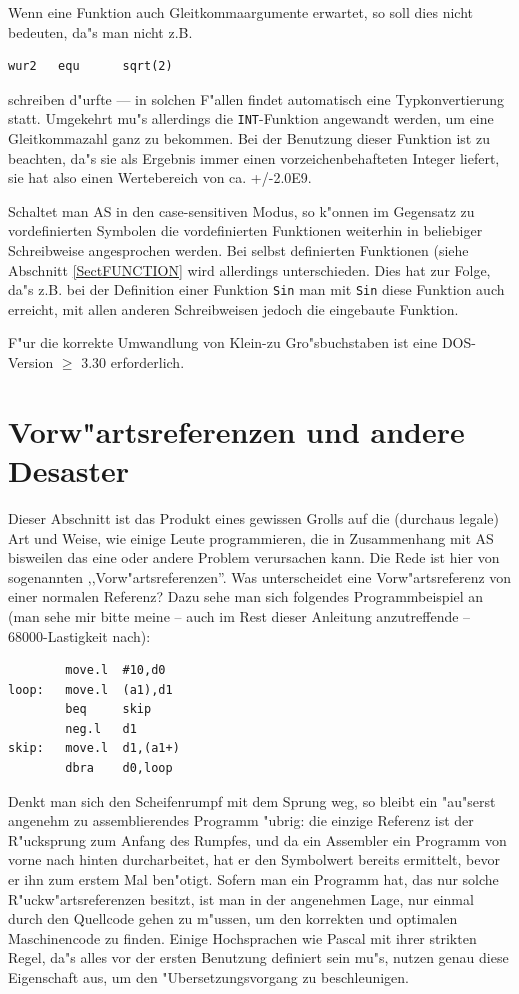 \documentclass[12pt,a4paper,twoside]{report}
\newcommand{\tty}[1]{{\tt #1}}
\newcommand{\asname}{AS}
\begin{document}
Wenn eine Funktion auch Gleitkommaargumente erwartet, so soll
dies nicht bedeuten, da"s man nicht z.B.
\begin{verbatim}
wur2   equ      sqrt(2)
\end{verbatim}
schreiben d"urfte --- in solchen F"allen findet automatisch eine
Typkonvertierung statt.  Umgekehrt mu"s allerdings die \tty{INT}-Funktion
angewandt werden, um eine Gleitkommazahl ganz zu bekommen.  Bei der
Benutzung dieser Funktion ist zu beachten, da"s sie als Ergebnis
immer einen vorzeichenbehafteten Integer liefert, sie hat also
einen Wertebereich von ca. +/-2.0E9.
\par
Schaltet man \asname{} in den case-sensitiven Modus, so k"onnen im
Gegensatz zu vordefinierten Symbolen die vordefinierten Funktionen
weiterhin in beliebiger Schreibweise angesprochen werden.  Bei
selbst definierten Funktionen (siehe Abschnitt \ref{SectFUNCTION}
wird allerdings unterschieden.  Dies  hat zur Folge, da"s z.B. bei
der Definition einer Funktion \tty{Sin} man mit \tty{Sin} diese
Funktion auch erreicht, mit allen anderen Schreibweisen jedoch die
eingebaute Funktion.
\par
F"ur die korrekte Umwandlung  von Klein-zu
Gro"sbuchstaben ist eine DOS-Version $\geq$ 3.30
erforderlich.

\vspace{2mm}


\section{Vorw"artsreferenzen und andere Desaster}
\label{ForwRefs}

Dieser Abschnitt ist das Produkt eines gewissen Grolls auf die (durchaus
legale) Art und Weise, wie einige Leute programmieren, die in Zusammenhang
mit \asname{} bisweilen das eine oder andere Problem verursachen kann.  Die Rede
ist hier von sogenannten ,,Vorw"artsreferenzen''.  Was unterscheidet eine
Vorw"artsreferenz von einer normalen Referenz?  Dazu sehe man sich folgendes
Programmbeispiel an (man sehe mir bitte meine -- auch im Rest dieser Anleitung
anzutreffende -- 68000-Lastigkeit nach):
\begin{verbatim}
        move.l  #10,d0
loop:   move.l  (a1),d1
        beq     skip
        neg.l   d1
skip:   move.l  d1,(a1+)
        dbra    d0,loop
\end{verbatim}
Denkt man sich den Scheifenrumpf mit dem Sprung weg, so bleibt ein
"au"serst angenehm zu assemblierendes Programm "ubrig: die einzige
Referenz ist der R"ucksprung zum Anfang des Rumpfes, und da ein
Assembler ein Programm von vorne nach hinten durcharbeitet, hat er
den Symbolwert bereits ermittelt, bevor er ihn zum erstem Mal ben"otigt.
Sofern man ein Programm hat, das nur solche R"uckw"artsreferenzen besitzt,
ist man in der angenehmen Lage, nur einmal durch den Quellcode gehen zu
m"ussen, um den korrekten und optimalen Maschinencode zu finden.  Einige
Hochsprachen wie Pascal mit ihrer strikten Regel, da"s alles vor der ersten
Benutzung definiert sein mu"s, nutzen genau diese Eigenschaft aus, um den
"Ubersetzungsvorgang zu beschleunigen.
\end{document}
